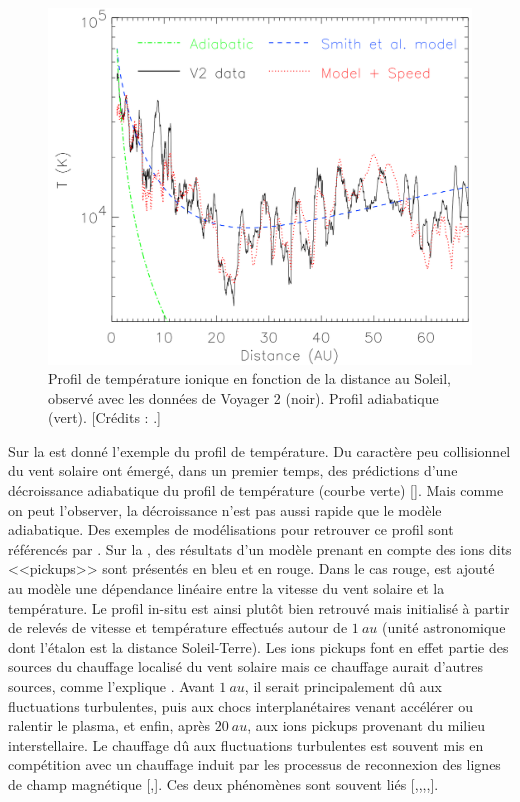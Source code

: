 \begin{figure}[!ht]
 \centering
\includegraphics[width=0.8\linewidth,trim=0.5cm 0cm 0cm 0cm, clip=true]{./Part_0/images/heating_profil}
\cprotect\caption{Profil de température ionique en fonction de la distance au Soleil, observé avec les données de Voyager 2 (noir). Profil adiabatique (vert).  [Crédits : \cite{richardson_radial_2003}.]}
\label{fig:profil}
\end{figure}
Sur la  est donné l'exemple du profil de température. Du caractère peu collisionnel du vent solaire ont émergé, dans un premier temps, des prédictions d'une décroissance adiabatique du profil de température (courbe verte) [\cite{tu_mhd_1995}]. Mais comme on peut l'observer, la décroissance n'est pas aussi rapide que le modèle adiabatique. Des exemples de modélisations pour retrouver ce profil sont référencés par \cite{richardson_radial_2003}. Sur la , des résultats d'un modèle prenant en compte des ions dits <<pickups>> sont présentés en bleu et en rouge. Dans le cas rouge, est ajouté au modèle une dépendance linéaire entre la vitesse du vent solaire et la température. Le profil in-situ est ainsi plutôt bien retrouvé mais initialisé à partir de relevés de vitesse et température effectués autour de $\SI{1}{au}$ (unité astronomique dont l'étalon est la distance Soleil-Terre). Les ions pickups font en effet partie des sources du chauffage localisé du vent solaire mais ce chauffage aurait d'autres sources, comme l'explique \cite{david_energy_2022}. 
Avant $\SI{1}{au}$, il serait principalement dû aux fluctuations turbulentes, puis aux chocs interplanétaires venant accélérer ou ralentir le plasma, et enfin, après $\SI{20}{au}$, aux ions pickups provenant du milieu interstellaire. Le chauffage dû aux fluctuations turbulentes est souvent mis en compétition avec un chauffage induit par les processus de reconnexion des lignes de champ magnétique [\cite{matthaeus_who_2011},\cite{cranmer_role_2015}]. Ces deux phénomènes sont souvent liés [\cite{sundkvist_dissipation_2007},\cite{retino_situ_2007},\cite{servidio_magnetic_2011},\cite{chasapis_thin_2015},\cite{manzini_subion-scale_2023}].  

